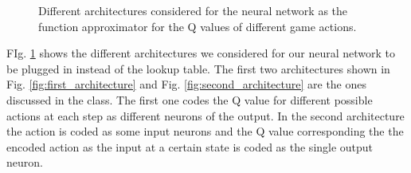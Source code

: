 \documentclass[a4paper,12pt]{article}
\begin{document}
\begin{figure}[ht]
 \hfill  
 \hfill  
\caption{Different architectures considered for the neural network as the function approximator for the Q values of different game actions.}
\label{fig:architectures}
\end{figure}
FIg. \ref{fig:architectures} shows the different architectures we considered for our neural network to be plugged in instead of the lookup table. The first two architectures shown in Fig. \ref{fig:first_architecture} and Fig. \ref{fig:second_architecture} are the ones discussed in the class. The first one codes the Q value for different possible actions at each step as different neurons of the output. In the second architecture the action is coded as some input neurons and the Q value corresponding the the encoded action as the input at a certain state is coded as the single output neuron. 
\end{document}
